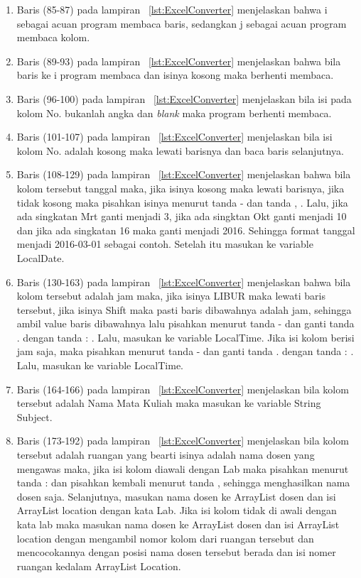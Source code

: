 \begin{enumerate}
\begin{enumerate}
		\item Baris (85-87) pada lampiran ~\ref{lst:ExcelConverter} menjelaskan bahwa i sebagai acuan program membaca baris, sedangkan j sebagai acuan program membaca kolom.
		\item Baris (89-93) pada lampiran ~\ref{lst:ExcelConverter} menjelaskan bahwa bila baris ke i program membaca dan isinya kosong maka berhenti membaca.
		\item Baris (96-100) pada lampiran ~\ref{lst:ExcelConverter} menjelaskan bila isi pada kolom No. bukanlah angka dan \textit{blank} maka program berhenti membaca.
		\item Baris (101-107) pada lampiran ~\ref{lst:ExcelConverter} menjelaskan	bila isi kolom No. adalah kosong maka lewati barisnya dan baca baris selanjutnya.
		\item Baris (108-129) pada lampiran ~\ref{lst:ExcelConverter} menjelaskan bahwa bila kolom tersebut tanggal maka, jika isinya kosong maka lewati barisnya, jika tidak kosong maka pisahkan isinya menurut tanda - dan tanda , . Lalu, jika ada singkatan Mrt ganti menjadi 3, jika ada singktan Okt ganti menjadi 10 dan jika ada singkatan 16 maka ganti menjadi 2016. Sehingga format tanggal menjadi 2016-03-01 sebagai contoh. Setelah itu masukan ke variable LocalDate.
		\item Baris (130-163) pada lampiran ~\ref{lst:ExcelConverter} menjelaskan bahwa bila kolom tersebut adalah jam maka, jika isinya LIBUR maka lewati baris tersebut, jika isinya Shift maka pasti baris dibawahnya adalah jam, sehingga ambil value baris dibawahnya lalu pisahkan menurut tanda - dan ganti tanda . dengan tanda : . Lalu, masukan ke variable LocalTime. Jika isi kolom berisi jam saja, maka pisahkan menurut tanda - dan ganti tanda . dengan tanda : . Lalu, masukan ke variable LocalTime.
		\item Baris (164-166) pada lampiran ~\ref{lst:ExcelConverter} menjelaskan bila kolom tersebut adalah Nama Mata Kuliah maka masukan ke variable String Subject.
		\item Baris (173-192) pada lampiran ~\ref{lst:ExcelConverter} menjelaskan bila kolom tersebut adalah ruangan yang bearti isinya adalah nama dosen yang mengawas maka, jika isi kolom diawali dengan Lab maka pisahkan menurut tanda : dan pisahkan kembali menurut tanda , sehingga menghasilkan nama dosen saja. Selanjutnya, masukan nama dosen ke ArrayList dosen dan isi ArrayList location dengan kata Lab. Jika isi kolom tidak di awali dengan kata lab maka masukan nama dosen ke ArrayList dosen dan isi ArrayList location dengan mengambil nomor kolom dari ruangan tersebut dan mencocokannya dengan posisi nama dosen tersebut berada dan isi nomer ruangan kedalam ArrayList Location.

\end{enumerate}
\end{enumerate}
